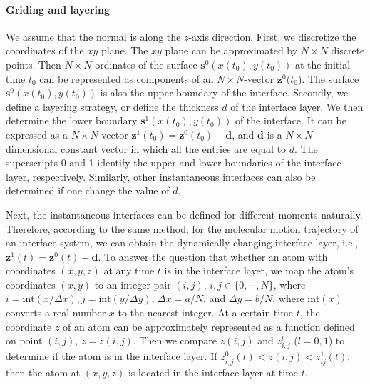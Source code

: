 \paragraph{Griding and layering}
We assume that the normal is along the $z$-axis direction. 
First, we discretize the coordinates of the $xy$ plane. 
The $xy$ plane can be approximated by $N\times N$ discrete points. 
Then $N\times N$ ordinates of the surface ${\mathbf s}^0(x(t_0),y(t_0))$ at the initial time $t_0$ can be represented as components of an $N\times N$-vector ${\mathbf z}^0(t_0$). 
The surface ${\mathbf s}^0(x(t_0),y(t_0))$ is also the upper boundary of the interface.
Secondly, we define a layering strategy, or define the thickness $d$ of the interface layer. 
We then determine the lower boundary ${\mathbf s}^1(x(t_0),y(t_0))$ of the interface. 
It can be expressed as a $N\times N$-vector ${\mathbf z}^1(t_0)={\mathbf z}^0(t_0)-{\mathbf d}$, 
and ${\mathbf d}$ is a $N\times N$-dimensional constant vector in which all the entries are equal to $d$. 
The superscripts 0 and 1 identify the upper and lower boundaries of the interface layer, respectively. 
Similarly, other instantaneous interfaces can also be determined if one change the value of $d$.

Next, the instantaneous interfaces can be defined for different moments naturally. 
Therefore, according to the same method, for the molecular motion trajectory of an interface system, 
we can obtain the dynamically changing interface layer, i.e., ${\mathbf z}^1(t)={\mathbf z}^0(t)-{\mathbf d}$. 
To answer the question that whether an atom with coordinates $(x, y, z)$ at any time $t$ is in the interface layer,
we map the atom's coordinates $(x, y)$ to an integer pair $(i, j)$, $i,j \in  \{0,\cdots,N\}$, 
where $i = \text{int}(x /\Delta x), j = \text{int}(y/\Delta y)$, $\Delta x = a/N$, and $\Delta y = b/N$, 
where $\text{int}(x)$ converts a real number $x$ to the nearest integer.
At a certain time $t$, the coordinate $z$ of an atom can be approximately represented as a function defined on point $(i, j)$, $z=z(i,j)$. 
Then we compare $z(i,j)$ and $z^l_{i,j}$ ($l=0,1$) to determine if the atom is in the interface layer. 
If $z^0_{i,j}(t)<z(i,j)<z^1_{ij}(t)$, then the atom at $(x,y,z)$ is located in the interface layer at time $t$.

